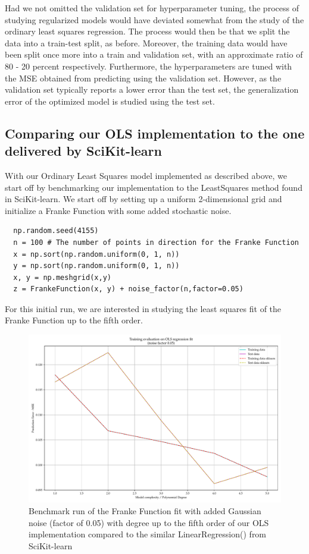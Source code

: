 \documentclass[11pt, a4paper]{article}
\begin{document}
Had we not omitted the validation set for hyperparameter tuning, the process of studying regularized models would have deviated somewhat from the study of the ordinary least squares regression. The process would then be that we split the data into a train-test split, as before. Moreover, the training data would have been split once more into a train and validation set, with an approximate ratio of 80 - 20 percent respectively. Furthermore, the hyperparameters are tuned with the MSE obtained from predicting using the validation set. However, as the validation set typically reports a lower error than the test set, the generalization error of the optimized model is studied using the test set. \cite{Goodfellow2016}

\subsection*{Comparing our OLS implementation to the one delivered by SciKit-learn}
With our Ordinary Least Squares model implemented as described above, we start off by benchmarking our implementation to the LeastSquares method found in SciKit-learn. \cite{scikit-learn} We start off by setting up a uniform 2-dimensional grid and initialize a Franke Function with some added stochastic noise.

\begin{lstlisting}
  np.random.seed(4155)
  n = 100 # The number of points in direction for the Franke Function
  x = np.sort(np.random.uniform(0, 1, n))
  y = np.sort(np.random.uniform(0, 1, n))
  x, y = np.meshgrid(x,y)
  z = FrankeFunction(x, y) + noise_factor(n,factor=0.05)
\end{lstlisting}

For this initial run, we are interested in studying the least squares fit of the Franke Function up to the fifth order.

\begin{figure}[h]
  \centering
  \includegraphics[scale=0.5]{figures/EX1_franke_function_OLS_evaluate_fit_1.pdf}
  \caption{\label{fig:OLS_franke_1} Benchmark run of the Franke Function fit with added Gaussian noise (factor of 0.05) with degree up to the fifth order of our OLS implementation compared to the similar LinearRegression() from SciKit-learn}
\end{figure}
\end{document}
